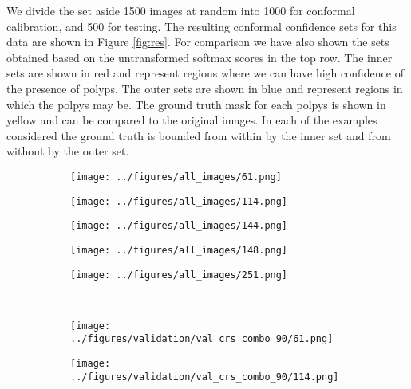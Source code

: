 We divide the set aside 1500 images at random into 1000 for conformal calibration, and 500 for testing. The resulting conformal confidence sets for this data are shown in Figure \ref{fig:res}. For comparison we have also shown the sets obtained based on the untransformed softmax scores in the top row. The inner sets are shown in red and represent regions where we can have high confidence of the presence of polyps. The outer sets are shown in blue and represent regions in which the polpys may be. The ground truth mask for each polpys is shown in yellow and can be compared to the original images. In each of the examples considered the ground truth is bounded from within by the inner set and from without by the outer set. 
\begin{figure}[h!]
	\begin{subfigure}{0.19\textwidth}
		\centering
		\texttt{[image: ../figures/all\_images/61.png]}
		\label{fig:1}
	\end{subfigure}
	\begin{subfigure}{0.19\textwidth}
		\centering
		\texttt{[image: ../figures/all\_images/114.png]}
		\label{fig:1}
	\end{subfigure}
	\begin{subfigure}{0.19\textwidth}
		\centering
		\texttt{[image: ../figures/all\_images/144.png]}
		\label{fig:1}
	\end{subfigure}
	\begin{subfigure}{0.19\textwidth}
		\centering
		\texttt{[image: ../figures/all\_images/148.png]}
		\label{fig:1}
	\end{subfigure}
	\begin{subfigure}{0.19\textwidth}
		\centering
		\texttt{[image: ../figures/all\_images/251.png]}
		\label{fig:1}
	\end{subfigure}
	\vspace{-0.35cm}
	\\
	\begin{subfigure}{0.19\textwidth}
		\centering
		\texttt{[image: ../figures/validation/val\_crs\_combo\_90/61.png]}
		\label{fig:1}
	\end{subfigure}
	\begin{subfigure}{0.19\textwidth}
		\centering
		\texttt{[image: ../figures/validation/val\_crs\_combo\_90/114.png]}
		\label{fig:1}
	\end{subfigure}
	\begin{subfigure}{0.19\textwidth}

\end{subfigure}
\end{figure}
